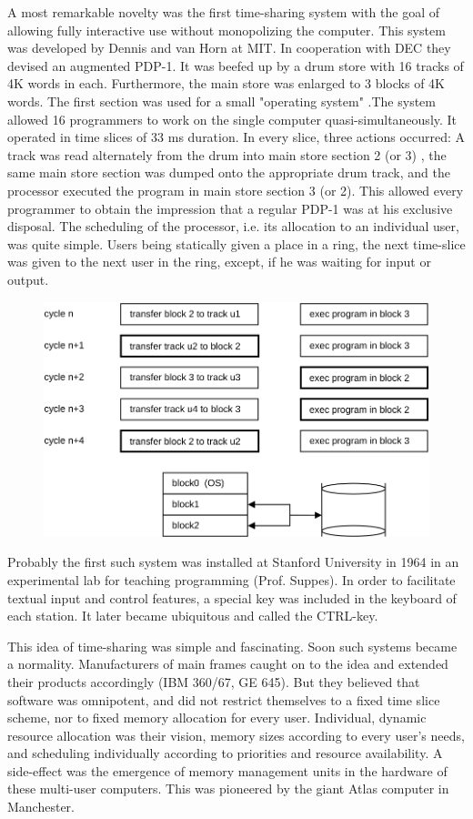 A most remarkable novelty was the first time-sharing system with the goal of
allowing fully interactive use without monopolizing the computer. This system was
developed by Dennis and van Horn at MIT. In cooperation with DEC they devised
an augmented PDP-1. It was beefed up by a drum store with 16 tracks of 4K words
in each. Furthermore, the main store was enlarged to 3 blocks of 4K words. The
first section was used for a small "operating system" .The system allowed 16
programmers to work on the single computer quasi-simultaneously. It operated in
time slices of 33 ms duration. In every slice, three actions occurred: A track was
read alternately from the drum into main store section 2 (or 3) , the same main
store section was dumped onto the appropriate drum track, and the processor
executed the program in main store section 3 (or 2). This allowed every
programmer to obtain the impression that a regular PDP-1 was at his exclusive
disposal. The scheduling of the processor, i.e. its allocation to an individual user,
was quite simple. Users being statically given a place in a ring, the next time-slice
was given to the next user in the ring, except, if he was waiting for input or output.
\begin{figure}[h!]
  \centering
  \includegraphics[width=\textwidth]{i/4}
\end{figure}

Probably the first such system was installed at Stanford University in 1964 in an
experimental lab for teaching programming (Prof. Suppes). In order to facilitate
textual input and control features, a special key was included in the keyboard of
each station. It later became ubiquitous and called the CTRL-key.

This idea of time-sharing was simple and fascinating. Soon such systems became
a normality. Manufacturers of main frames caught on to the idea and extended
their products accordingly (IBM 360/67, GE 645). But they believed that software
was omnipotent, and did not restrict themselves to a fixed time slice scheme, nor
to fixed memory allocation for every user. Individual, dynamic resource allocation
was their vision, memory sizes according to every user's needs, and scheduling
individually according to priorities and resource availability. A side-effect was the
emergence of memory management units in the hardware of these multi-user
computers. This was pioneered by the giant Atlas computer in Manchester.

